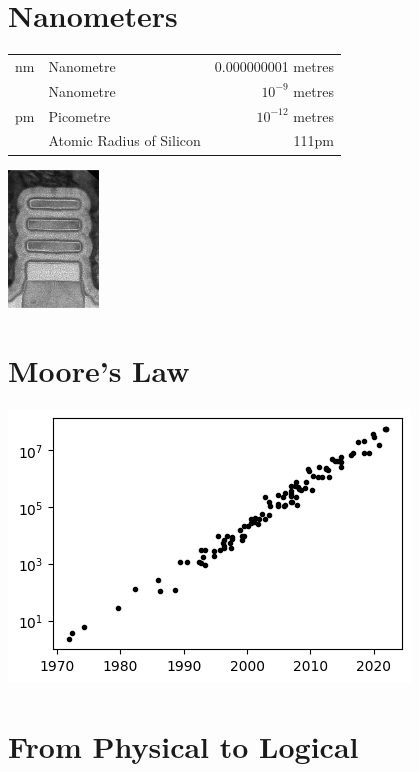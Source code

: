 \documentclass{iansnotes}
\begin{document}
\section{Nanometers}
\begin{table}
\begin{tabular}{rlr}
  \toprule
  nm & Nanometre                & 0.000000001 metres \\
     & Nanometre                &   $10^{-9}$ metres \\
  pm & Picometre                &  $10^{-12}$ metres \\
     & Atomic Radius of Silicon & 111pm              \\
  \bottomrule
\end{tabular}
\end{table}
\begin{marginfigure}[-30mm]
  \centering
  \includegraphics[width=24mm]{img/ibm2nm.png}
\end{marginfigure}


\section{Moore's Law}
\includegraphics{img/moores_law.png}



\section{From Physical to Logical}
\end{document}
